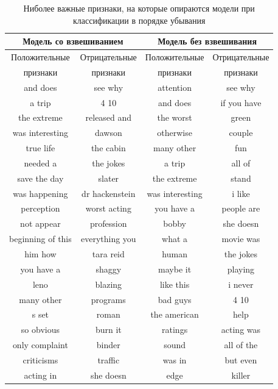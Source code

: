 \begin{table}
\begin{tabular*}{\textwidth}{c @{\extracolsep {\fill}} ccc}
\hline \multicolumn{2}{c}{Модель со взвешиванием} & \multicolumn{2}{c}{Модель без взвешивания} \\ \hline
Положительные & Отрицательные & Положительные & Отрицательные \\
признаки & признаки & признаки & признаки \\ \hline \hline
and does & see why & attention & see why \\ \hline
a trip & 4 10 & and does & if you have \\ \hline
the extreme & released and & the worst & green \\ \hline
was interesting & dawson & otherwise & couple \\ \hline
true life & the cabin & many other & fun \\ \hline
needed a & the jokes & a trip & all of \\ \hline
save the day & slater & the extreme & stand \\ \hline
was happening & dr hackenstein & was interesting & i like \\ \hline
perception & worst acting & you have a & people are \\ \hline
not appear & profession & bobby & she doesn \\ \hline
beginning of this & everything you & what a & movie was \\ \hline
him how & tara reid & human & the jokes \\ \hline
you have a & shaggy & maybe it & playing \\ \hline
leno & blazing & like this & i never \\ \hline
many other & programs & bad guys & 4 10 \\ \hline
s set & roman & the american & help \\ \hline
so obvious & burn it & ratings & acting was \\ \hline
only complaint & binder & sound & all of the \\ \hline
criticisms & traffic & was in & but even \\ \hline
acting in & she doesn & edge & killer \\ \hline
\end{tabular*}
\caption{Ниболее важные признаки, на которые опираются модели при классификации в порядке убывания}
\label{features}
\end{table}